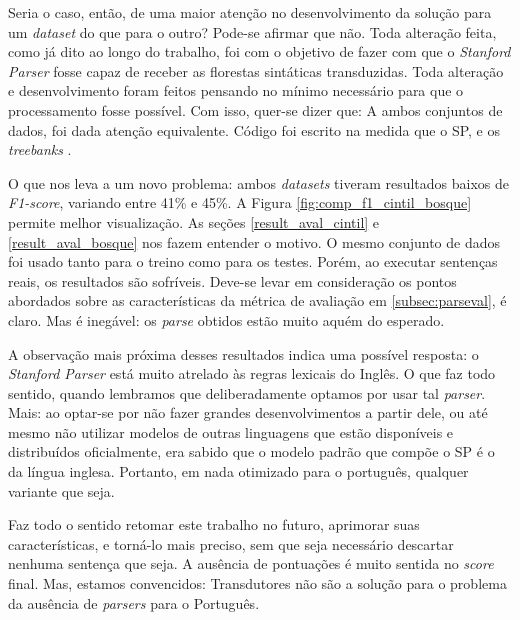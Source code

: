 Seria o caso, então, de uma maior atenção no desenvolvimento da solução para um \textit{dataset} do que para o outro? Pode-se afirmar que não. Toda alteração feita, como já dito ao longo do trabalho, foi com o objetivo de fazer com que o \textit{Stanford Parser} fosse capaz de receber as florestas sintáticas transduzidas. Toda alteração e desenvolvimento foram feitos pensando no mínimo necessário para que o processamento fosse possível. Com isso, quer-se dizer que: A ambos conjuntos de dados, foi dada atenção equivalente.
Código foi escrito na medida que o SP, e os \textit{treebanks} .
\begin{center}
    
\end{center}
O que nos leva a um novo problema: ambos \textit{datasets} tiveram resultados baixos de \textit{F1-score}, variando entre 41\% e 45\%. A Figura \ref{fig:comp_f1_cintil_bosque} permite melhor visualização.
As seções \ref{result_aval_cintil} e \ref{result_aval_bosque} nos fazem entender o motivo. O mesmo conjunto de dados foi usado tanto para o treino como para os testes. Porém, ao executar sentenças reais, os resultados são sofríveis. Deve-se levar em consideração os pontos abordados sobre as características da métrica de avaliação em \ref{subsec:parseval}, é claro. Mas é inegável: os \textit{parse} obtidos estão muito aquém do esperado. 

A observação mais próxima desses resultados indica uma possível resposta: o \textit{Stanford Parser} está muito atrelado às regras lexicais do Inglês. O que faz todo sentido, quando lembramos que deliberadamente optamos por usar tal \textit{parser}. Mais: ao optar-se por não fazer grandes desenvolvimentos a partir dele, ou até mesmo não utilizar modelos de outras linguagens que estão disponíveis e distribuídos oficialmente, era sabido que o modelo padrão que compõe o SP é o da língua inglesa. Portanto, em nada otimizado para o português, qualquer variante que seja. 

Faz todo o sentido retomar este trabalho no futuro, aprimorar suas características, e torná-lo mais preciso, sem que seja necessário descartar nenhuma sentença que seja. A ausência de pontuações é muito sentida no \textit{score} final. Mas, estamos convencidos: Transdutores não são a solução para o problema da ausência de \textit{parsers} para o Português.

